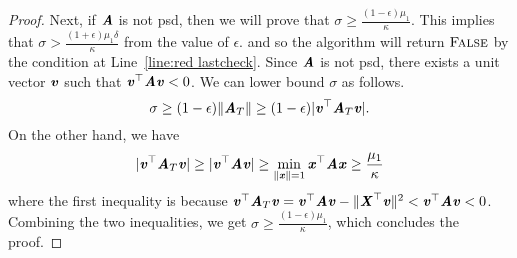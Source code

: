 \begin{proof}
Next, if $\AA$ is not psd, then we will prove that $\sigma\ge\frac{(1-\epsilon)\mu_{1}}{\kappa}.$ This implies that $\sigma>\frac{(1+\epsilon)\mu_{1}\delta}{\kappa}$ from the value of $\epsilon$.  
and so the algorithm will return $\textsc{False}$ by the condition at Line~\ref{line:red lastcheck}. Since $\AA$ is not psd, there exists a unit vector $\vv$ such that $\vv^{\top}\AA\vv<0$. We can lower bound $\sigma$ as follows.
\[
\sigma\ge(1-\epsilon)\|\AA_{T}\|\ge(1-\epsilon)|\vv^{\top}\AA_{T}\vv|.
\]
On the other hand, we have
\[
|\vv^{\top}\AA_{T}\vv|\ge|\vv^{\top}\AA\vv|\ge\min_{\|\xx\|=1}\xx^{\top}\AA\xx\ge\frac{\mu_{1}}{\kappa}
\]
where the first inequality is because $\vv^{\top}\AA_{T}\vv=\vv^{\top}\AA\vv-\|\XX^{\top}\vv\|^{2}<\vv^{\top}\AA\vv<0$. Combining the two inequalities, we get $\sigma\ge\frac{(1-\epsilon)\mu_{1}}{\kappa}$, which concludes the proof.
 \end{proof}


